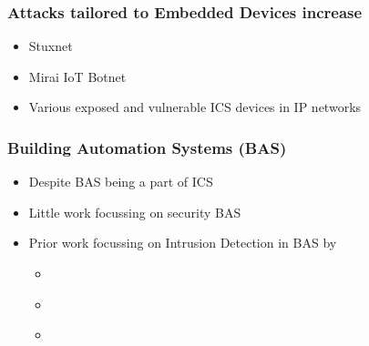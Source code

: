 \begin{frame}[c]
	\frametitle{Attacks tailored to Embedded Devices increase}
	
	\begin{itemize}
		\item Stuxnet \parencite{Karnouskos2011}
		\item Mirai IoT Botnet \parencite{Kolias2017}
		\item Various exposed and vulnerable ICS devices in IP networks \parencite{Roth2017}
	\end{itemize}
	
\end{frame}

\begin{frame}[c]
	\frametitle{Building Automation Systems (BAS)}
	
	\begin{itemize}
		\item Despite BAS being a part of ICS
		\item Little work focussing on security BAS
		\item Prior work focussing on Intrusion Detection in BAS by
			\begin{itemize}
				\item \textcite{Yang2006}
				\item \textcite{Celeda2012}
				\item \textcite{Pan2014}
			\end{itemize}
	\end{itemize}

\end{frame}


